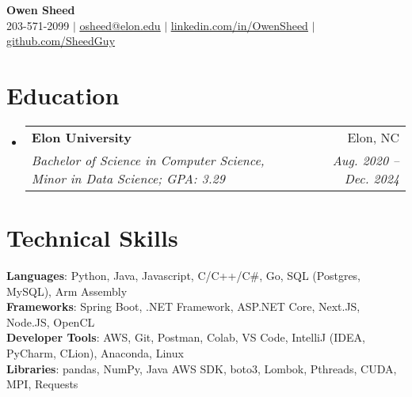 \documentclass[letterpaper,11pt]{article}
\makeatletter
\newcommand{\resumeSubheading}[4]{
  \vspace{-2pt}\item
    \begin{tabular*}{0.97\textwidth}[t]{l@{\extracolsep{\fill}}r}
      \textbf{#1} & #2 \\
      \textit{\small#3} & \textit{\small #4} \\
    \end{tabular*}\vspace{-7pt}
}
\newcommand{\resumeSubHeadingListStart}{\begin{itemize}[leftmargin=0.15in, label={}]}
\newcommand{\resumeSubHeadingListEnd}{\end{itemize}}
\makeatother
\begin{document}
\begin{center}
  \textbf{\Huge Owen Sheed} \\ \vspace{1pt}
  \small 203-571-2099 $|$
  \href{mailto:osheed@elon.edu}{\uline{osheed@elon.edu}} $|$ 
  \href{https://www.linkedin.com/in/owensheed/}{\uline{linkedin.com/in/OwenSheed}} $|$
  \href{https://github.com/SheedGuy}{\uline{github.com/SheedGuy}}
\end{center}


\section{Education}
  \resumeSubHeadingListStart
    \resumeSubheading
      {Elon University}{Elon, NC}
      {Bachelor of Science in Computer Science, Minor in Data Science; GPA: 3.29}{Aug. 2020 -- Dec. 2024}
  \resumeSubHeadingListEnd

\section{Technical Skills}
 \begin{itemize}[leftmargin=0.15in, label={}]
    \small{\item{
     \textbf{Languages}{: Python, Java, Javascript, C/C++/C\#, Go, SQL (Postgres, MySQL), Arm Assembly} \\
     \textbf{Frameworks}{: Spring Boot, .NET Framework, ASP.NET Core, Next.JS, Node.JS, OpenCL} \\
     \textbf{Developer Tools}{: AWS, Git, Postman, Colab, VS Code, IntelliJ (IDEA, PyCharm, CLion), Anaconda, Linux} \\
     \textbf{Libraries}{: pandas, NumPy, Java AWS SDK, boto3, Lombok, Pthreads, CUDA, MPI, Requests}
    }}
 \end{itemize}
\end{document}
